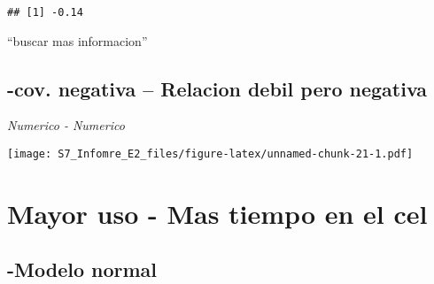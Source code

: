 \documentclass[
]{article}
\newenvironment{Shaded}{\begin{snugshade}}{\end{snugshade}}
\newcommand{\AttributeTok}[1]{\textcolor[rgb]{0.77,0.63,0.00}{#1}}
\newcommand{\DecValTok}[1]{\textcolor[rgb]{0.00,0.00,0.81}{#1}}
\newcommand{\FunctionTok}[1]{\textcolor[rgb]{0.00,0.00,0.00}{#1}}
\newcommand{\NormalTok}[1]{#1}
\newcommand{\OtherTok}[1]{\textcolor[rgb]{0.56,0.35,0.01}{#1}}
\newcommand{\SpecialCharTok}[1]{\textcolor[rgb]{0.00,0.00,0.00}{#1}}
\newcommand{\StringTok}[1]{\textcolor[rgb]{0.31,0.60,0.02}{#1}}
\begin{document}
\begin{verbatim}
## [1] -0.14
\end{verbatim}

``buscar mas informacion''

\hypertarget{cov.-negativa-relacion-debil-pero-negativa}{%
\subsection{-cov. negativa -- Relacion debil pero
negativa}\label{cov.-negativa-relacion-debil-pero-negativa}}

\emph{Numerico - Numerico}

\begin{Shaded}
\end{Shaded}

\texttt{[image: S7\_Infomre\_E2\_files/figure-latex/unnamed-chunk-21-1.pdf]}

\hypertarget{mayor-uso---mas-tiempo-en-el-cel}{%
\section{Mayor uso - Mas tiempo en el
cel}\label{mayor-uso---mas-tiempo-en-el-cel}}

\hypertarget{modelo-normal}{%
\subsection{-Modelo normal}\label{modelo-normal}}
\end{document}
